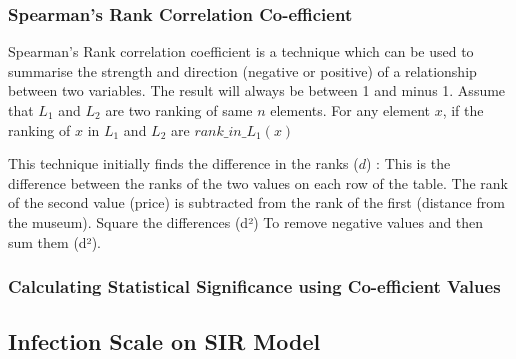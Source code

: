 \documentclass[sigconf]{acmart}
\begin{document}
\subsubsection{Spearman's Rank Correlation Co-efficient}
Spearman’s Rank correlation coefficient is a technique which can be used to summarise the strength and direction (negative or positive) of a relationship between two variables.
The result will always be between 1 and minus 1. Assume that $L_1$ and $L_2$ are two ranking of same $n$ elements. For any element $x$, if the ranking of $x$ in $L_1$ and $L_2$ are $rank\_in\_L_1(x)$

This technique initially finds the difference in the ranks ($d$) : This is the difference between the ranks of the two values on each row of the table. The rank of the second value (price) is subtracted from the rank of the first (distance from the museum).
Square the differences (d²) To remove negative values and then sum them (d²).
 
\subsubsection{Calculating Statistical Significance using Co-efficient Values}



\subsection{Infection Scale on SIR Model}
\end{document}
